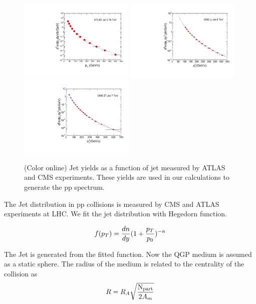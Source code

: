 \documentclass[reprint,amsmath,amssymb,aps,showpacs,showkeys]{revtex4}
\begin{document}
\begin{figure}
  \includegraphics[width=0.49\textwidth]{Figures/Fig_ATLAS_JetYield_JetPt_PP276TeV.pdf}
  \includegraphics[width=0.49\textwidth]{Figures/Fig_CMS_JetYield_GammaPlusJet_JetPt_PP7TeV.pdf}
  \includegraphics[width=0.49\textwidth]{Figures/Fig_CMS_JetYield_Z0PlusJet_JetPt_PP7TeV.pdf}
  \caption{(Color online) Jet yields as a function of jet \pt measured by ATLAS and CMS experiments.
    These yields are used in our calculations to generate the pp spectrum.}
  \label{Fig:DiJetAsymPt}
\end{figure}


The Jet \pt distribution in pp collisions is measured by CMS and ATLAS experiments at LHC.
We fit the jet \pt distribution with Hegedorn function.

\begin{equation}
  f(p_{T}) = \frac{dn}{dy}(1+\frac{p_{T}}{p_0})^{-n}\\
\end{equation}

The Jet \pt is generated from the fitted function. Now the QGP medium is assumed as a
static sphere. The radius of the medium is related to the centrality of the collision
as 
\begin{equation}
  R = R_{A}\sqrt{\frac{\rm N_{part}}{2A_{m}}}\\
\end{equation}
\end{document}
